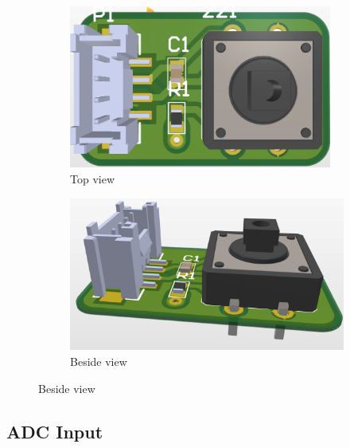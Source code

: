 \begin{figure}[h!]
    \centering
    \begin{subfigure}{0.495\textwidth}
        \centering
        \includegraphics[width=0.95\textwidth]{graphics/ex4/f4.png}
        \caption*{Top view}
    \end{subfigure}
    \hfill
    \begin{subfigure}{0.495\textwidth}
        \centering
        \includegraphics[width=\textwidth]{graphics/ex4/f5.png}
        \caption*{Beside view}
    \end{subfigure}
\end{figure}

\subsection{ADC Input}
